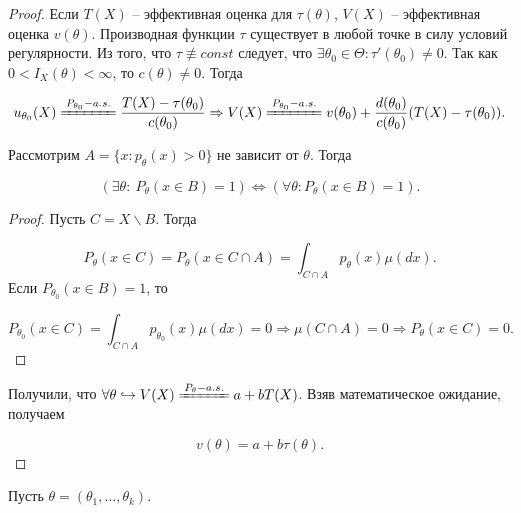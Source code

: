 \begin{proof}
Если $\displaystyle T( X)$ -- эффективная оценка для $\displaystyle \tau ( \theta )$, $\displaystyle V( X)$ -- эффективная оценка $\displaystyle v( \theta )$. Производная функции $\displaystyle \tau $ существует в любой точке в силу условий регулярности. Из того, что $\displaystyle \tau \nequiv const$ следует, что $\displaystyle \exists \theta _{0} \in \Theta :\tau '( \theta _{0}) \neq 0$. Так как $\displaystyle 0< I_{X}( \theta ) < \infty $, то $\displaystyle c( \theta ) \neq 0$. Тогда


\begin{equation*}
u_{\theta _{0}}( X)\xlongequal{P_{\theta _{0}} -a.s.}\frac{T( X) -\tau ( \theta _{0})}{c( \theta _{0})} \Rightarrow V( X)\xlongequal{P_{\theta _{0}} -a.s.} v( \theta _{0}) +\frac{d( \theta _{0})}{c( \theta _{0})}( T( X) -\tau ( \theta _{0})) .
\end{equation*}
\begin{exercise}
Рассмотрим $\displaystyle A=\{x:p_{\theta }( x)  >0\}$ не зависит от $\displaystyle \theta $. Тогда


\begin{equation*}
( \exists \theta :\ P_{\theta }( x\in B) =1) \Leftrightarrow ( \forall \theta :P_{\theta }( x\in B) =1) .
\end{equation*}
\end{exercise}
\begin{proof}
Пусть $\displaystyle C=X\backslash B$. Тогда


\begin{equation*}
P_{\theta }( x\in C) =P_{\theta }( x\in C\cap A) =\int _{C\cap A} p_{\theta }( x) \mu ( dx) .
\end{equation*}
Если $\displaystyle P_{\theta _{0}}( x\in B) =1$, то


\begin{equation*}
P_{\theta _{0}}( x\in C) =\int _{C\cap A} p_{\theta _{0}}( x) \mu ( dx) =0\Rightarrow \mu ( C\cap A) =0\Rightarrow P_{\theta }( x\in C) =0.
\end{equation*}
\end{proof}
Получили, что $\displaystyle \forall \theta \hookrightarrow V( X)\xlongequal{P_{\theta } -a.s.} a+bT( X)$. Взяв математическое ожидание, получаем


\begin{equation*}
v( \theta ) =a+b\tau ( \theta ) .
\end{equation*}
\end{proof}
Пусть $\displaystyle \theta =( \theta _{1} ,\dotsc ,\theta _{k})$.
